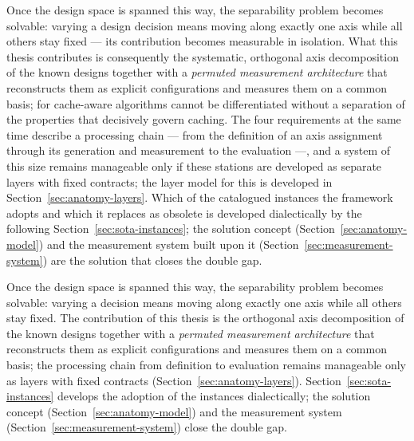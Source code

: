 \begin{nurlang}
Once the design space is spanned this way, the separability problem becomes solvable: varying a design
decision means moving along exactly one axis while all others stay fixed --- its contribution becomes
measurable in isolation. What this thesis contributes is consequently the systematic, orthogonal axis
decomposition of the known designs together with a \emph{permuted measurement architecture} that
reconstructs them as explicit configurations and measures them on a common basis; for cache-aware
algorithms cannot be differentiated without a separation of the properties that decisively govern
caching. The four requirements at the same time describe a processing chain --- from the definition of an
axis assignment through its generation and measurement to the evaluation ---, and a system of this size
remains manageable only if these stations are developed as separate layers with fixed contracts; the
layer model for this is developed in Section~\ref{sec:anatomy-layers}. Which of the catalogued instances
the framework adopts and which it replaces as obsolete is developed dialectically by the following
Section~\ref{sec:sota-instances}; the solution concept
(Section~\ref{sec:anatomy-model}) and the measurement system built upon it
(Section~\ref{sec:measurement-system}) are the solution that closes the double gap.
\end{nurlang}
\begin{nurkurz}
Once the design space is spanned this way, the separability problem becomes solvable: varying a decision
means moving along exactly one axis while all others stay fixed. The contribution of this thesis is the
orthogonal axis decomposition of the known designs together with a \emph{permuted measurement
architecture} that reconstructs them as explicit configurations and measures them on a common basis; the
processing chain from definition to evaluation remains manageable only as layers with fixed contracts
(Section~\ref{sec:anatomy-layers}). Section~\ref{sec:sota-instances} develops the adoption of the
instances dialectically; the solution concept (Section~\ref{sec:anatomy-model}) and the measurement system
(Section~\ref{sec:measurement-system}) close the double gap.
\end{nurkurz}


